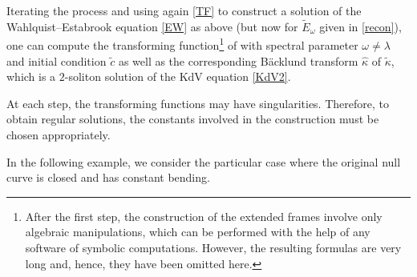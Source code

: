 \documentclass[pdftex]{sigma}
\numberwithin{equation}{section}
\def\bending{\kappa}
\begin{document}
Iterating the process and using again \eqref{TF} to construct a solution of the Wahlquist--Estabrook equation \eqref{EW} as above \big(but now for $\widetilde{E}_\omega$ given in \eqref{recon}\big), one can compute the transforming function\footnote{After the first step, the construction of the extended frames involve only algebraic manipulations, which can be performed with the help of any software of symbolic computations. However, the resulting formulas are very long and, hence, they have been omitted here.}  of \smash{$\widetilde{\bending}$}  with spectral parameter $\omega\neq \lambda$ and initial condition $\widetilde{c}$ as well as the corresponding B\"{a}cklund transform $\widehat{\bending}$ of $\widetilde{\bending}$, which is a $2$-soliton solution of the KdV equation \eqref{KdV2}.

\begin{Remark} At each step, the transforming functions may have singularities. Therefore, to obtain regular solutions, the constants involved in the construction must be chosen appropriately.
\end{Remark}

In the following example, we consider the particular case where the original null curve is closed and has constant bending.
\end{document}
